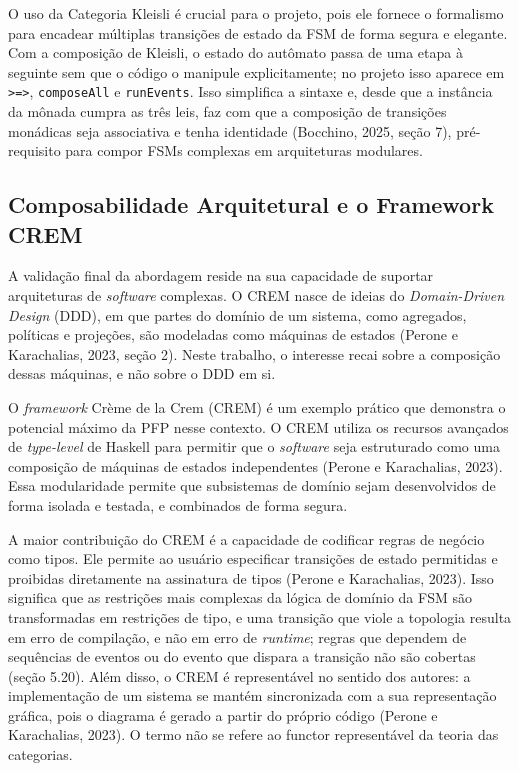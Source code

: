 \documentclass[12pt,a4paper]{article}
\begin{document}
O uso da Categoria Kleisli é crucial para o projeto, pois ele fornece o formalismo para encadear múltiplas transições de estado da FSM de forma segura e elegante. Com a composição de Kleisli, o estado do autômato passa de uma etapa à seguinte sem que o código o manipule explicitamente; no projeto isso aparece em \texttt{>=>}, \texttt{composeAll} e \texttt{runEvents}. Isso simplifica a sintaxe e, desde que a instância da mônada cumpra as três leis, faz com que a composição de transições monádicas seja associativa e tenha identidade (Bocchino, 2025, seção 7), pré-requisito para compor FSMs complexas em arquiteturas modulares.

\subsection{Composabilidade Arquitetural e o Framework CREM}

A validação final da abordagem reside na sua capacidade de suportar arquiteturas de \textit{software} complexas. O CREM nasce de ideias do \textit{Domain-Driven Design} (DDD), em que partes do domínio de um sistema, como agregados, políticas e projeções, são modeladas como máquinas de estados (Perone e Karachalias, 2023, seção 2). Neste trabalho, o interesse recai sobre a composição dessas máquinas, e não sobre o DDD em si.

O \textit{framework} Crème de la Crem (CREM) é um exemplo prático que demonstra o potencial máximo da PFP nesse contexto. O CREM utiliza os recursos avançados de \textit{type-level} de Haskell para permitir que o \textit{software} seja estruturado como uma composição de máquinas de estados independentes (Perone e Karachalias, 2023). Essa modularidade permite que subsistemas de domínio sejam desenvolvidos de forma isolada e testada, e combinados de forma segura.

A maior contribuição do CREM é a capacidade de codificar regras de negócio como tipos. Ele permite ao usuário especificar transições de estado permitidas e proibidas diretamente na assinatura de tipos (Perone e Karachalias, 2023). Isso significa que as restrições mais complexas da lógica de domínio da FSM são transformadas em restrições de tipo, e uma transição que viole a topologia resulta em erro de compilação, e não em erro de \textit{runtime}; regras que dependem de sequências de eventos ou do evento que dispara a transição não são cobertas (seção 5.20). Além disso, o CREM é representável no sentido dos autores: a implementação de um sistema se mantém sincronizada com a sua representação gráfica, pois o diagrama é gerado a partir do próprio código (Perone e Karachalias, 2023). O termo não se refere ao functor representável da teoria das categorias.
\end{document}
